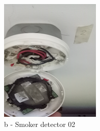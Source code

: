 \begin{figure}[!h]
\begin{minipage}[b]{0.22\linewidth}
		\includegraphics[width=\textwidth]{figures/ch05_fdas_sd02}
		\caption*{b - Smoker detector 02}
	\end{minipage}
	\hspace{0.03cm}
	\begin{minipage}[b]{0.22\linewidth}
		\centering

\end{minipage}
\end{figure}
